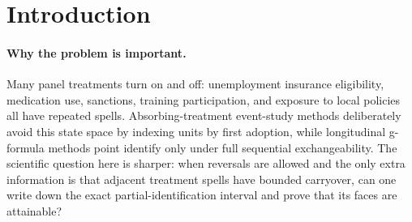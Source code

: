 \documentclass[11pt]{article}
\theoremstyle{definition}
\theoremstyle{plain}
\theoremstyle{remark}
\begin{document}
\begin{abstract}
Reversible treatments create dynamic histories that cannot be compressed to an absorbing adoption date, yet unrestricted dynamic partial-identification bounds are often too wide to guide empirical practice.  This proposal asks whether a scalar bound on adjacent-spell carryover turns the sharp finite-horizon ATE problem into a finite metric-extension problem.  The routine component is a two-terminal McShane-Whitney formula for the sharp contrast between any two treatment-history means when only observed history anchors and a spell-boundary Lipschitz radius are imposed; this is treated as inherited Lipschitz-extension algebra, not as the flagship novelty.  The flagship conjecture is that, for reversible finite-memory panels, those marginal metric-extension faces lift through a normalized cell-vertex Farkas/Hall certificate that preserves the full observed trajectory law, so endpoint pasting is not period-by-period free.  If true, this would move smoothness-based partial identification beyond static treatment-response restrictions by giving reversible-spell endpoint laws, finite-radius width reductions, and sharpness witnesses for dynamic panels without stationarity or parallel trends.
\end{abstract}

\section{Introduction}
\paragraph{Why the problem is important.}
Many panel treatments turn on and off: unemployment insurance eligibility, medication use, sanctions, training participation, and exposure to local policies all have repeated spells.  Absorbing-treatment event-study methods deliberately avoid this state space by indexing units by first adoption, while longitudinal g-formula methods point identify only under full sequential exchangeability.  The scientific question here is sharper: when reversals are allowed and the only extra information is that adjacent treatment spells have bounded carryover, can one write down the exact partial-identification interval and prove that its faces are attainable?
\end{document}
